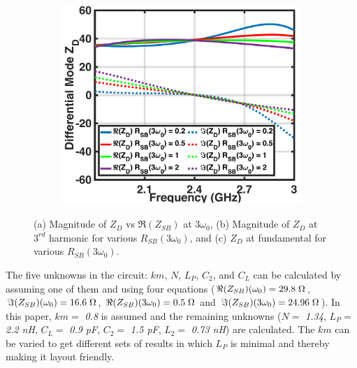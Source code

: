 \documentclass[conference]{IEEEtran}
\begin{document}
\begin{figure}[!t]
\begin{subfigure}{0.24\textwidth}
\caption{}
\label{fig:Design_A_Rn_var_3H}
\end{subfigure}
\begin{subfigure}{0.4\textwidth}
\centering
\includegraphics[width=1\textwidth]{Images/Design/Design_A_Rn_var_1H.pdf}
\caption{}
\label{fig:Design_A_Rn_var_1H}
\end{subfigure}
\caption{(a) Magnitude of $Z_{D}$ vs $\Re(Z_{SB})$ at $3\omega_0$, (b) Magnitude of $Z_D$ at $3^{rd}$ harmonic for various $R_{SB}(3\omega_0)$, and (c) $Z_D$ at fundamental for various $R_{SB}(3\omega_0)$.}
\label{fig:Design_A_Rn_var}
\vspace{-0.2in}
\end{figure}

The five unknowns in the circuit: $km$, $N$, $L_P$, $C_2$, and $C_L$ can be calculated by assuming one of them and using four equations ($\Re(Z_{SB})(\omega_0) =  29.8\hspace{1mm} \Omega$, $\Im(Z_{SB})(\omega_0) = 16.6\hspace{1mm}\Omega$, $\Re(Z_{SB})(3\omega_0) = 0.5\hspace{1mm}\Omega$ and  $\Im(Z_{SB})(3\omega_0) = 24.96\hspace{1mm}\Omega$). In this paper, $km =$ \textit{0.8} is assumed and the remaining unknowns ($N =$ \textit{1.34}, $L_P =$ \textit{2.2 nH}, $C_L =$ \textit{0.9 pF}, $C_2 =$ \textit{1.5 pF}, $L_2 =$ \textit{0.73 nH}) are calculated. The $km$ can be varied to get different sets of results in which $L_P$ is minimal and thereby making it layout friendly.
\end{document}
